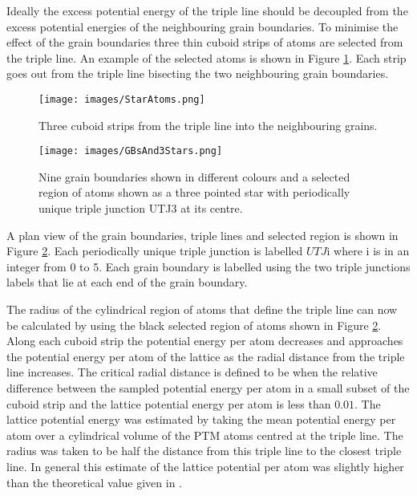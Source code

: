 \documentclass[12pt,a4paper,openany]{report}
\newcommand{\ts}[1]{\textrm{#1}}
\begin{document}
Ideally the excess potential energy of the triple line should be decoupled from the excess potential energies of the neighbouring grain boundaries. To minimise the effect of the grain boundaries three thin cuboid strips of atoms are selected from the triple line. An example of the selected atoms is shown in Figure \ref{fig:StarAtoms}. Each strip goes out from the triple line bisecting the two neighbouring grain boundaries. 

\begin{figure}[H]
	\centering
	\texttt{[image: images/StarAtoms.png]} 
	\caption{Three cuboid strips from the triple line into the
	neighbouring grains.}
	\label{fig:StarAtoms}
\end{figure}

\begin{figure}[H]
	\centering
	\texttt{[image: images/GBsAnd3Stars.png]} 
	\caption{Nine grain boundaries shown in different colours and a selected region of atoms shown as a three pointed star with periodically unique triple junction UTJ3 at its centre.}   
	\label{fig:GBsandStar}
\end{figure}


A plan view of the grain boundaries, triple lines and selected region is shown in Figure \ref{fig:GBsandStar}. Each periodically unique triple junction is labelled $UTJ\ts{i}$ where $\ts{i}$ is in an integer from 0 to 5. Each grain boundary is labelled using the two triple junctions labels that lie at each end of the grain boundary.

The radius of the cylindrical region of atoms that define the triple line can now be calculated by using the black selected region of atoms shown in Figure \ref{fig:GBsandStar}. Along each cuboid strip the potential energy per atom decreases and approaches the potential energy per atom of the lattice as the radial distance from the triple line increases. The critical radial distance is defined to be when the relative difference  between the sampled potential energy per atom in a small subset of the cuboid strip and the lattice potential energy per atom is less than $0.01$. The lattice potential energy was estimated by taking the mean potential energy per atom over a cylindrical volume of the PTM atoms centred at the triple line. The radius was taken to be half the distance from this triple line to the closest triple line. In general this estimate of the lattice potential per atom was slightly higher than the theoretical value given in \cite{Zope2003}.
\end{document}
